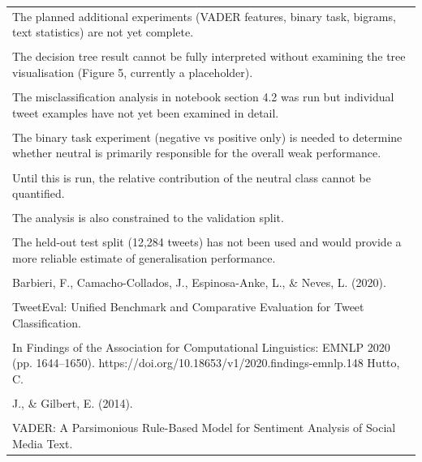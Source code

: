 \documentclass[11pt]{article}
\begin{document}
\begin{longtable}{|p{\dimexpr\linewidth-2\tabcolsep-2\arrayrulewidth\relax}|}
\hline
\rule{0pt}{3.5cm} \\
\hline
The planned additional experiments (VADER features, binary task, bigrams, text statistics) are not yet complete. \\[2pt]
\hline
\rule{0pt}{3.5cm} \\
\hline
The decision tree result cannot be fully interpreted without examining the tree visualisation (Figure 5, currently a placeholder). \\[2pt]
\hline
\rule{0pt}{3.5cm} \\
\hline
The misclassification analysis in notebook section 4.2 was run but individual tweet examples have not yet been examined in detail. \\[2pt]
\hline
\rule{0pt}{3.5cm} \\
\hline
The binary task experiment (negative vs positive only) is needed to determine whether neutral is primarily responsible for the overall weak performance. \\[2pt]
\hline
\rule{0pt}{3.5cm} \\
\hline
Until this is run, the relative contribution of the neutral class cannot be quantified. \\[2pt]
\hline
\rule{0pt}{3.5cm} \\
\hline
The analysis is also constrained to the validation split. \\[2pt]
\hline
\rule{0pt}{3.5cm} \\
\hline
The held-out test split (12,284 tweets) has not been used and would provide a more reliable estimate of generalisation performance. \\[2pt]
\hline
\rule{0pt}{3.5cm} \\
\hline
Barbieri, F., Camacho-Collados, J., Espinosa-Anke, L., \& Neves, L. (2020). \\[2pt]
\hline
\rule{0pt}{3.5cm} \\
\hline
TweetEval: Unified Benchmark and Comparative Evaluation for Tweet Classification. \\[2pt]
\hline
\rule{0pt}{3.5cm} \\
\hline
In Findings of the Association for Computational Linguistics: EMNLP 2020 (pp. 1644--1650). https://doi.org/10.18653/v1/2020.findings-emnlp.148 Hutto, C. \\[2pt]
\hline
\rule{0pt}{3.5cm} \\
\hline
J., \& Gilbert, E. (2014). \\[2pt]
\hline
\rule{0pt}{3.5cm} \\
\hline
VADER: A Parsimonious Rule-Based Model for Sentiment Analysis of Social Media Text. \\[2pt]

\end{longtable}
\end{document}
